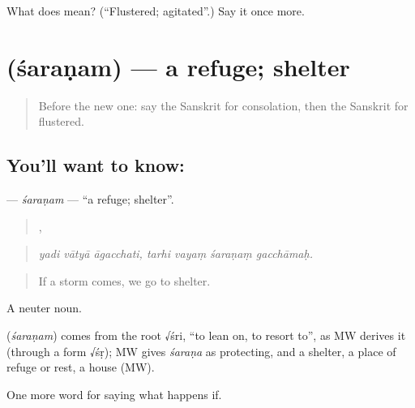 \begin{tcolorbox}[breakable,colback=teal!4,colframe=teal!35!black,title={Before you move on}]
What does  mean? (\textquotedblleft{}Flustered; agitated\textquotedblright{}.) Say it once more.
\end{tcolorbox}
\section[\texorpdfstring{\sk{शरणम्} (śaraṇam)}{शरणम् (śaraṇam)}]{ (śaraṇam) — a refuge; shelter}

\label{lesson:SA-C548-saranam}



\begin{quote}
Before the new one: say the Sanskrit for consolation, then the Sanskrit for flustered.
\end{quote}

\subsection*{You'll want to know: }
\textbf{} — \emph{śaraṇam} — \textquotedblleft{}a refuge; shelter\textquotedblright{}.

\begin{quote}
  ,    
\end{quote}

\begin{quote}
\emph{yadi vātyā āgacchati, tarhi vayaṃ śaraṇaṃ gacchāmaḥ.}
\end{quote}

\begin{quote}
If a storm comes, we go to shelter.
\end{quote}

A neuter noun.

\begin{cousinweb}
\textbf{} (\emph{śaraṇam}) comes from the root √śri, \textquotedblleft{}to lean on, to resort to\textquotedblright{}, as MW derives it (through a form √śṛ); MW gives \emph{śaraṇa} as protecting, and a shelter, a place of refuge or rest, a house (MW).
\end{cousinweb}

\begin{grammarlens}[title={What you've built}]
One more word for saying what happens if.
\end{grammarlens}

